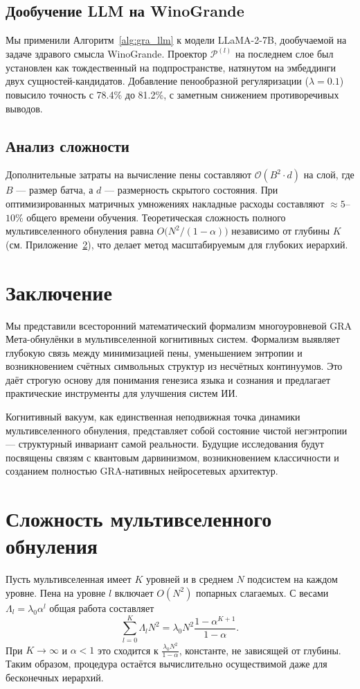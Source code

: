 \documentclass[11pt]{article}
\newcommand{\cP}{\mathcal{P}}
\begin{document}
\subsection{Дообучение LLM на WinoGrande}
Мы применили Алгоритм~\ref{alg:gra_llm} к модели LLaMA-2-7B, дообучаемой на задаче здравого смысла WinoGrande. Проектор $\cP^{(l)}$ на последнем слое был установлен как тождественный на подпространстве, натянутом на эмбеддинги двух сущностей-кандидатов. Добавление пенообразной регуляризации ($\lambda=0.1$) повысило точность с 78.4\% до 81.2\%, с заметным снижением противоречивых выводов.

\subsection{Анализ сложности}
Дополнительные затраты на вычисление пены составляют $\mathcal{O}(B^2 \cdot d)$ на слой, где $B$ --- размер батча, а $d$ --- размерность скрытого состояния. При оптимизированных матричных умножениях накладные расходы составляют $\approx 5$--$10\%$ общего времени обучения. Теоретическая сложность полного мультивселенного обнуления равна $O\bigl(N^2/(1-\alpha)\bigr)$ независимо от глубины $K$ (см. Приложение~\ref{sec:complexity}), что делает метод масштабируемым для глубоких иерархий.

\section{Заключение}
Мы представили всесторонний математический формализм многоуровневой GRA Мета-обнулёнки в мультивселенной когнитивных систем. Формализм выявляет глубокую связь между минимизацией пены, уменьшением энтропии и возникновением счётных символьных структур из несчётных континуумов. Это даёт строгую основу для понимания генезиса языка и сознания и предлагает практические инструменты для улучшения систем ИИ.

Когнитивный вакуум, как единственная неподвижная точка динамики мультивселенного обнуления, представляет собой состояние чистой негэнтропии --- структурный инвариант самой реальности. Будущие исследования будут посвящены связям с квантовым дарвинизмом, возникновением классичности и созданием полностью GRA-нативных нейросетевых архитектур.

\appendix
\section{Сложность мультивселенного обнуления}
\label{sec:complexity}
Пусть мультивселенная имеет $K$ уровней и в среднем $N$ подсистем на каждом уровне. Пена на уровне $l$ включает $O(N^2)$ попарных слагаемых. С весами $\Lambda_l = \lambda_0 \alpha^l$ общая работа составляет
\[
\sum_{l=0}^K \Lambda_l N^2 = \lambda_0 N^2 \frac{1-\alpha^{K+1}}{1-\alpha}.
\]
При $K \to \infty$ и $\alpha<1$ это сходится к $\frac{\lambda_0 N^2}{1-\alpha}$, константе, не зависящей от глубины. Таким образом, процедура остаётся вычислительно осуществимой даже для бесконечных иерархий.
\end{document}

